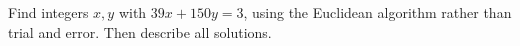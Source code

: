Find integers $x,y$ with $39x+150y=3$, using the Euclidean algorithm rather than trial and error. Then describe all solutions.
